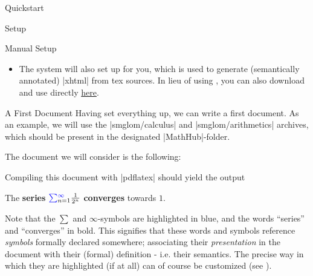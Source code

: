 \begin{omgroup}{Quickstart}
\begin{omgroup}{Setup}
\begin{omgroup}{Manual Setup}
\begin{itemize}
          Once set up, we can run |mmt| in a shell and download an archive along with
          all of its dependencies like this: |lmh install <name-of-repository>|,
          or a whole \emph{group} of archives; for example,
          |lmh install smglom| will download all smglom archives.
        \item \textbf{\RusTeX} The \mmt system will also set up \RusTeX for you,
          which is used to generate (semantically annotated)
          |xhtml| from tex sources. In lieu of using \mmt, you
          can also download and use \RusTeX directly
          \href{https://github.com/slatex/RusTeX}{here}.

      \end{itemize}
    \end{omgroup}
	\end{omgroup}
	\begin{omgroup}{A First \sTeX Document}
    Having set everything up, we can write a first
    \sTeX document. As an example, we will use the
    |smglom/calculus| and |smglom/arithmetics| archives, 
    which should be present in the designated |MathHub|-folder.

    The document we will consider is the following:
    \begin{framed}\end{framed}

    Compiling this document with |pdflatex| should yield
    the output

    \begin{framed}
        The \textbf{series} 
        $\textcolor{blue}{\sum}_{n=1}^{\textcolor{blue}\infty} $
        \textbf{converges} towards $1$.
    \end{framed}

    Note that the $\sum$ and $\infty$-symbols are highlighted in blue,
    and the words ``series'' and ``converges'' in bold.
    This signifies that these words and symbols 
    reference \sTeX \emph{symbols}
    formally declared somewhere; associating their 
    \emph{presentation} in the document with their (formal)
    definition - i.e. their semantics. The precise way
    in which they are highlighted (if at all) can of course
    be customized (see ).


\end{omgroup}
\end{omgroup}
